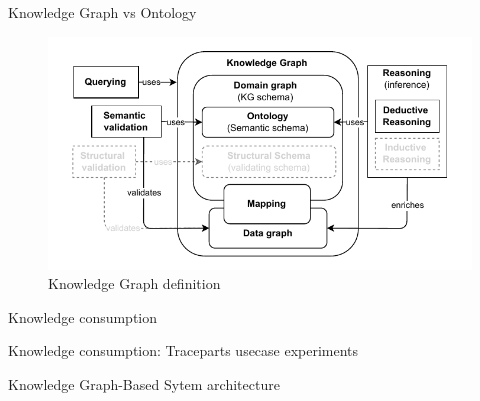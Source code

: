 \begin{frame}{Knowledge Graph vs Ontology}

    \begin{figure} [H]
        \begin{center}
            \includegraphics[scale=0.8]{images/kg-def-simple.pdf} 
            \caption{Knowledge Graph definition} 
        \end{center}
    \end{figure}

\end{frame}

\begin{frame}{Knowledge consumption}


\end{frame}

\begin{frame}{Knowledge consumption: Traceparts usecase experiments}


\end{frame}

\begin{frame}{Knowledge Graph-Based Sytem architecture}


\end{frame}